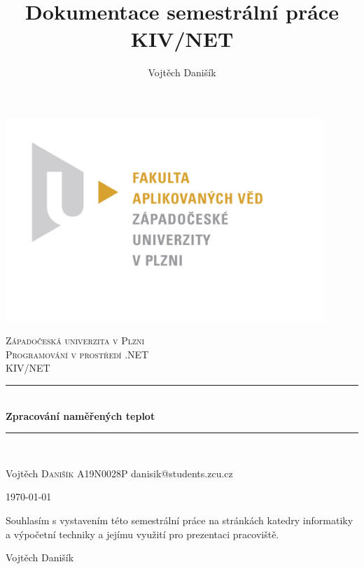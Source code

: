 \documentclass[12pt, a4paper]{article}
\title{\textbf{Dokumentace semestrální práce} \\KIV/NET}
\author{Vojtěch Danišík}
\begin{document}
\begin{titlepage} 
	\newcommand{\HRule}{\rule{\linewidth}{0.5mm}} 
	\begin{center}
	\includegraphics[width=12cm]{img/fav_logo}\\
	\end{center}
	\textsc{\LARGE Západočeská univerzita v Plzni}\\[1.5cm] 	
	\textsc{\Large Programování v prostředí .NET}\\[0.5cm] 
	\textsc{\large KIV/NET}\\[0.5cm] 
	\HRule\\[0.4cm]
	{\huge\bfseries Zpracování naměřených teplot}\\[0.4cm] 
	\HRule\\[1.5cm]
	
	\begin{minipage}{0.4\textwidth}
		\begin{flushleft}
			\large
			Vojtěch \textsc{Danišík}\newline
			A19N0028P\newline
			danisik@students.zcu.cz
		\end{flushleft}
	\end{minipage}
	\vfill\vfill\vfill
	\begin{flushright}
	{\large\today}
	\end{flushright}
	\vfill 
\end{titlepage}

\newpage
Souhlasím s vystavením této semestrální práce na stránkách katedry \newline informatiky a výpočetní techniky a jejímu využití pro prezentaci pracoviště.
\newline
\begin{flushright}
Vojtěch Danišík
\end{flushright}
\end{document}
